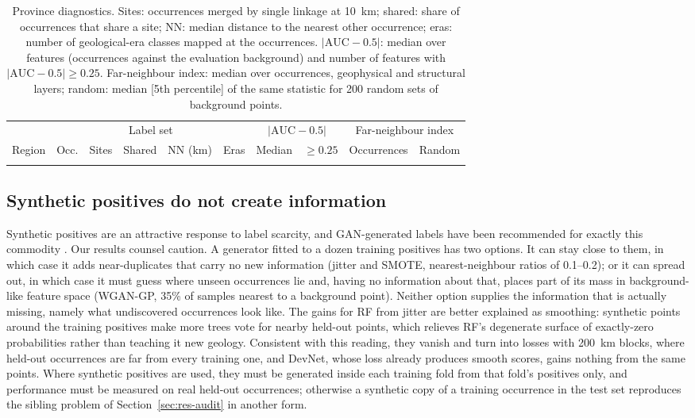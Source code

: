 \documentclass[pdflatex,sn-apa]{sn-jnl}
\begin{document}
\begin{table}[t]
\caption{Province diagnostics. Sites: occurrences merged by single linkage at 10~km; shared: share of occurrences that share a site; NN: median distance to the nearest other occurrence; eras: number of geological-era classes mapped at the occurrences. $|\mathrm{AUC}-0.5|$: median over features (occurrences against the evaluation background) and number of features with $|\mathrm{AUC}-0.5| \geq 0.25$. Far-neighbour index: median over occurrences, geophysical and structural layers; random: median [5th percentile] of the same statistic for 200 random sets of background points.}\label{tab:region-diag}
\scriptsize
\setlength{\tabcolsep}{2.5pt}
\begin{tabular*}{\textwidth}{@{\extracolsep\fill}lccccccccc}
\toprule
 & \multicolumn{5}{c}{Label set} & \multicolumn{2}{c}{$|\mathrm{AUC}-0.5|$} & \multicolumn{2}{c}{Far-neighbour index} \\
\cmidrule(lr){2-6}\cmidrule(lr){7-8}\cmidrule(lr){9-10}
Region & Occ. & Sites & Shared & NN (km) & Eras & Median & $\geq 0.25$ & Occurrences & Random \\
\midrule
\botrule
\end{tabular*}
\end{table}

\subsection{Synthetic positives do not create information}\label{sec:disc-gan}

Synthetic positives are an attractive response to label scarcity, and GAN-generated labels have been recommended for exactly this commodity \citep{Parsa2025}. Our results counsel caution. A generator fitted to a dozen training positives has two options. It can stay close to them, in which case it adds near-duplicates that carry no new information (jitter and SMOTE, nearest-neighbour ratios of 0.1--0.2); or it can spread out, in which case it must guess where unseen occurrences lie and, having no information about that, places part of its mass in background-like feature space (WGAN-GP, 35\% of samples nearest to a background point). Neither option supplies the information that is actually missing, namely what undiscovered occurrences look like. The gains for RF from jitter are better explained as smoothing: synthetic points around the training positives make more trees vote for nearby held-out points, which relieves RF's degenerate surface of exactly-zero probabilities rather than teaching it new geology. Consistent with this reading, they vanish and turn into losses with 200~km blocks, where held-out occurrences are far from every training one, and DevNet, whose loss already produces smooth scores, gains nothing from the same points. Where synthetic positives are used, they must be generated inside each training fold from that fold's positives only, and performance must be measured on real held-out occurrences; otherwise a synthetic copy of a training occurrence in the test set reproduces the sibling problem of Section~\ref{sec:res-audit} in another form.
\end{document}
